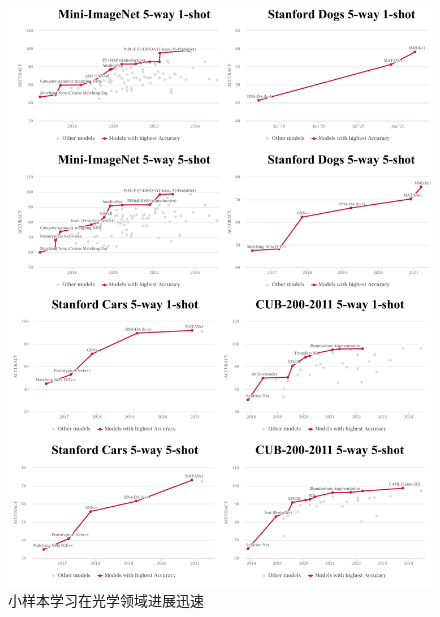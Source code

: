 \begin{figure}[h!]
    \centering
    \includegraphics[width=0.9\linewidth]{figures/fsl.pdf}
    \caption{小样本学习在光学领域进展迅速}
    \label{fig:fsl_task}
\end{figure}

